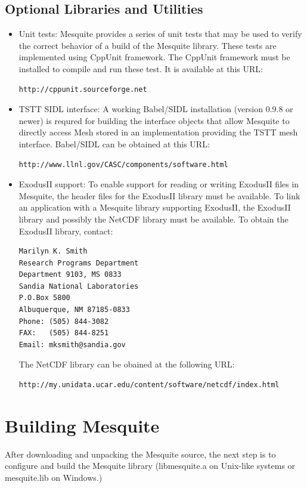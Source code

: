 \documentclass[letter]{report}
\begin{document}
\subsection{Optional Libraries and Utilities}
\begin{itemize}
\item Unit tests:  Mesquite provides a series of unit tests that may be used
to verify the correct behavior of a build of the Mesquite library.  These tests
are implemented using CppUnit framework.  The CppUnit framework must be installed
to compile and run these test.  It is available at this URL:
\begin{verbatim}
http://cppunit.sourceforge.net
\end{verbatim}
\item TSTT SIDL interface:  A working Babel/SIDL installation (version 0.9.8 or 
newer) is requred for building the interface objects that allow Mesquite to
directly access Mesh stored in an implementation providing the TSTT mesh interface.  Babel/SIDL can be obtained at this URL:
\begin{verbatim}
http://www.llnl.gov/CASC/components/software.html
\end{verbatim}
\item ExodusII support:  To enable support for reading or writing ExodusII files in Mesquite, the header files for the ExodusII library must be available.  To link an application with a Mesquite library supporting ExodusII, the ExodusII library and possibly the NetCDF library must be available.  To obtain the ExodusII library, contact:
\begin{verbatim}
Marilyn K. Smith
Research Programs Department
Department 9103, MS 0833
Sandia National Laboratories
P.O.Box 5800
Albuquerque, NM 87185-0833
Phone: (505) 844-3082
FAX:   (505) 844-8251
Email: mksmith@sandia.gov
\end{verbatim}
The NetCDF library can be obained at the following URL:
\begin{verbatim}
http://my.unidata.ucar.edu/content/software/netcdf/index.html
\end{verbatim}
\end{itemize}


\section{Building Mesquite}
\label{sec:compiling}
After downloading and unpacking the Mesquite source, the next step is to 
configure and build the Mesquite library (libmesquite.a on Unix-like systems or 
mesquite.lib on Windows.)
\end{document}
